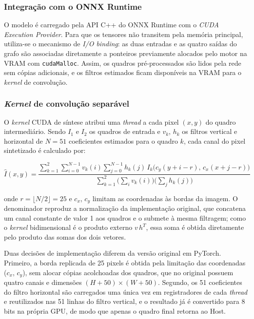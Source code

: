 \documentclass[
    12pt,                %
    openright,           %
    oneside,             %
    a4paper,             %
    english,             %
    brazil               %
]{abntex2}
\begin{document}
\subsubsection{Integração com o ONNX Runtime}

O modelo é carregado pela API C++ do ONNX Runtime com o \textit{CUDA Execution Provider}. Para que os tensores não transitem pela memória principal, utiliza-se o mecanismo de \textit{I/O binding}: as duas entradas e as quatro saídas do grafo são associadas diretamente a ponteiros previamente alocados pelo motor na VRAM com \texttt{cudaMalloc}. Assim, os quadros pré-processados são lidos pela rede sem cópias adicionais, e os filtros estimados ficam disponíveis na VRAM para o \textit{kernel} de convolução.

\subsubsection{\textit{Kernel} de convolução separável}
\label{sec:kernel_sepconv}

O \textit{kernel} CUDA de síntese atribui uma \textit{thread} a cada pixel $(x, y)$ do quadro intermediário. Sendo $I_1$ e $I_2$ os quadros de entrada e $v_k$, $h_k$ os filtros vertical e horizontal de $N = 51$ coeficientes estimados para o quadro $k$, cada canal do pixel sintetizado é calculado por:

\begin{equation}
\hat{I}(x,y) = \frac{\displaystyle\sum_{k=1}^{2} \sum_{i=0}^{N-1} v_k(i) \sum_{j=0}^{N-1} h_k(j)\, I_k\big(c_y(y+i-r),\, c_x(x+j-r)\big)}{\displaystyle\sum_{k=1}^{2} \Big(\sum_{i} v_k(i)\Big)\Big(\sum_{j} h_k(j)\Big)}
\label{eq:sepconv}
\end{equation}

\noindent onde $r = \lfloor N/2 \rfloor = 25$ e $c_x$, $c_y$ limitam as coordenadas às bordas da imagem. O denominador reproduz a normalização da implementação original, que concatena um canal constante de valor 1 aos quadros e o submete à mesma filtragem; como o \textit{kernel} bidimensional é o produto externo $v\,h^{T}$, essa soma é obtida diretamente pelo produto das somas dos dois vetores.

Duas decisões de implementação diferem da versão original em PyTorch. Primeiro, a borda replicada de 25 pixels é obtida pela limitação das coordenadas ($c_x$, $c_y$), sem alocar cópias acolchoadas dos quadros, que no original possuem quatro canais e dimensões $(H+50) \times (W+50)$. Segundo, os 51 coeficientes do filtro horizontal são carregados uma única vez em registradores de cada \textit{thread} e reutilizados nas 51 linhas do filtro vertical, e o resultado já é convertido para 8 bits na própria GPU, de modo que apenas o quadro final retorna ao Host.
\end{document}
